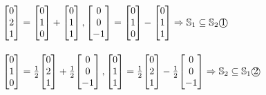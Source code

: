 \begin{doublespace}
$\begin{bmatrix}0\\2\\1\end{bmatrix}=\begin{bmatrix}0\\1\\0\end{bmatrix}+\begin{bmatrix}0\\1\\1\end{bmatrix}, 
\begin{bmatrix}0\\0\\-1\end{bmatrix}=\begin{bmatrix}0\\1\\0\end{bmatrix}-\begin{bmatrix}0\\1\\1\end{bmatrix} 
\Rightarrow \mathbb{S}_1 \subseteq \mathbb{S}_2 \textrm{\textcircled{1}}$\\ \ \\

$\begin{bmatrix}0\\1\\0\end{bmatrix}=\frac{1}{2}\!\begin{bmatrix}0\\2\\1\end{bmatrix}+\frac{1}{2}\!\begin{bmatrix}0\\0\\-1\end{bmatrix},
\begin{bmatrix}0\\1\\1\end{bmatrix}=\frac{1}{2}\!\begin{bmatrix}0\\2\\1\end{bmatrix}-\frac{1}{2}\!\begin{bmatrix}0\\0\\-1\end{bmatrix} 
\Rightarrow \mathbb{S}_2 \subseteq \mathbb{S}_1 \textrm{\textcircled{2}}$\\


\end{doublespace}
